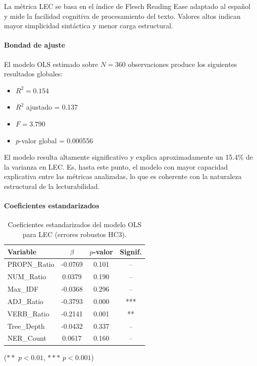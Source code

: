 \documentclass[../main.tex]{subfiles}
\begin{document}
La métrica LEC se basa en el índice de Flesch Reading Ease adaptado al español y mide la facilidad cognitiva de procesamiento del texto. Valores altos indican mayor simplicidad sintáctica y menor carga estructural.

\paragraph{Bondad de ajuste}

El modelo OLS estimado sobre $N = 360$ observaciones produce los siguientes resultados globales:

\begin{itemize}
\item $R^2 = 0.154$
\item $R^2$ ajustado = 0.137
\item $F = 3.790$
\item $p$-valor global = 0.000556
\end{itemize}

El modelo resulta altamente significativo y explica aproximadamente un 15.4\% de la varianza en LEC. Es, hasta este punto, el modelo con mayor capacidad explicativa entre las métricas analizadas, lo que es coherente con la naturaleza estructural de la lecturabilidad.

\paragraph{Coeficientes estandarizados}

\begin{table}[H]
\centering
\begin{tabular}{lccc}
\hline
Variable & $\beta$ & $p$-valor & Signif. \\
\hline
PROPN\_Ratio & -0.0769 & 0.101 & -- \\
NUM\_Ratio & 0.0379 & 0.190 & -- \\
Max\_IDF & -0.0368 & 0.296 & -- \\
ADJ\_Ratio & -0.3793 & 0.000 & *** \\
VERB\_Ratio & -0.2141 & 0.001 & ** \\
Tree\_Depth & -0.0432 & 0.337 & -- \\
NER\_Count & 0.0617 & 0.160 & -- \\
\hline
\end{tabular}
\caption{Coeficientes estandarizados del modelo OLS para LEC (errores robustos HC3).}
\end{table}

($**$ $p<0.01$, $***$ $p<0.001$)
\end{document}
